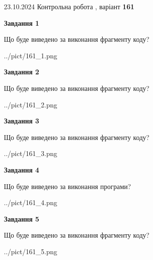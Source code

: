 \documentclass[12pt, ukrainian]{article}
\begin{document}
{\Large{23.10.2024 Контрольна робота , варіант  \No \textbf { 161 }\par}}
{
\begin {large}
{\begin {center}\textbf{Завдання 1}\end {center}}

Що буде виведено за виконання фрагменту коду?\par
\begin{center}
	{../pict/161_1.png}
\end{center}
\newpage

{\begin {center}\textbf{Завдання 2}\end {center}}

Що буде виведено за виконання фрагменту коду?\par
\begin{center}
	{../pict/161_2.png}
\end{center}
\newpage

{\begin {center}\textbf{Завдання 3}\end {center}}

Що буде виведено за виконання фрагменту коду?\par
\begin{center}
	{../pict/161_3.png}
\end{center}
\newpage

{\begin {center}\textbf{Завдання 4}\end {center}}

Що буде виведено за виконання програми?\par
\begin{center}
	{../pict/161_4.png}
\end{center}
\newpage

{\begin {center}\textbf{Завдання 5}\end {center}}

Що буде виведено за виконання фрагменту коду?\par
\begin{center}
	{../pict/161_5.png}
\end{center}
\newpage


\end{large}}
\end{document}
